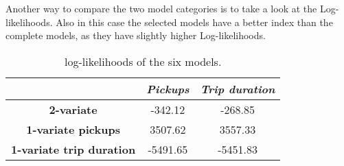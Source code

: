 Another way to compare the two model categories is to take a look at the Log-likelihoods. Also in this case the selected models have a better index than the complete models, as they have slightly higher Log-likelihoods.
\begin{table}[h!]
	\centering
	\renewcommand\arraystretch{1.3}
	\begin{tabular}{c|c|c}
		\hline
		\textit{} &\textit{Pickups} & \textit{Trip duration} \\ 
		\hline
		\textbf{2-variate } & -342.12  & -268.85    \\ 
		\hline
		\textbf{1-variate pickups } & 3507.62  & 3557.33    \\ 
		\hline
		\textbf{1-variate trip duration} & -5491.65  & -5451.83   \\ 
		\hline
	\end{tabular}
	\caption[Log-likelihoods of the six models (HDGM)]{log-likelihoods of the six models.}
	\label{Log-likelihoods HDGM}
\end{table}